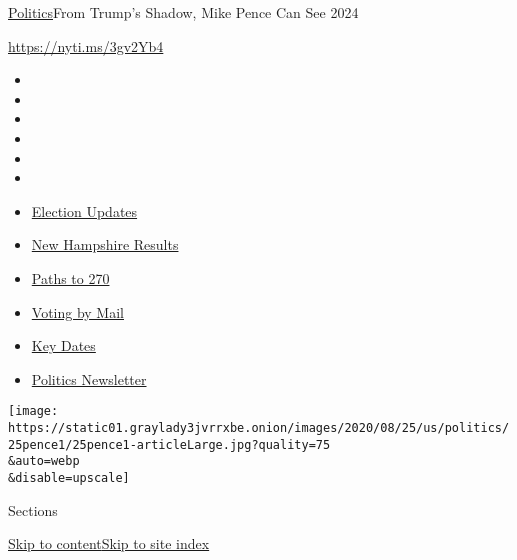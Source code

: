 \href{/section/politics}{Politics}\textbar{}From Trump's Shadow, Mike
Pence Can See 2024

\url{https://nyti.ms/3gv2Yb4}

\begin{itemize}
\item
\item
\item
\item
\item
\item
\end{itemize}

\begin{itemize}
\item
  \href{https://www.nytimes3xbfgragh.onion/live/2020/09/09/us/trump-vs-biden?action=click\&pgtype=Article\&state=default\&region=TOP_BANNER\&context=storylines_menu}{Election
  Updates}
\item
  \href{https://www.nytimes3xbfgragh.onion/interactive/2020/09/08/us/elections/results-new-hampshire-primary-elections.html?action=click\&pgtype=Article\&state=default\&region=TOP_BANNER\&context=storylines_menu}{New
  Hampshire Results}
\item
  \href{https://www.nytimes3xbfgragh.onion/interactive/2020/us/elections/election-states-biden-trump.html?action=click\&pgtype=Article\&state=default\&region=TOP_BANNER\&context=storylines_menu}{Paths
  to 270}
\item
  \href{https://www.nytimes3xbfgragh.onion/interactive/2020/08/31/us/politics/vote-by-mail-deadlines.html?action=click\&pgtype=Article\&state=default\&region=TOP_BANNER\&context=storylines_menu}{Voting
  by Mail}
\item
  \href{https://www.nytimes3xbfgragh.onion/interactive/2019/us/elections/2020-presidential-election-calendar.html?action=click\&pgtype=Article\&state=default\&region=TOP_BANNER\&context=storylines_menu}{Key
  Dates}
\item
  \href{https://www.nytimes3xbfgragh.onion/newsletters/politics?action=click\&pgtype=Article\&state=default\&region=TOP_BANNER\&context=storylines_menu}{Politics
  Newsletter}
\end{itemize}

\texttt{[image: https://static01.graylady3jvrrxbe.onion/images/2020/08/25/us/politics/25pence1/25pence1-articleLarge.jpg?quality=75\\\&auto=webp\\\&disable=upscale]}

Sections

\protect\hyperlink{site-content}{Skip to
content}\protect\hyperlink{site-index}{Skip to site index}

